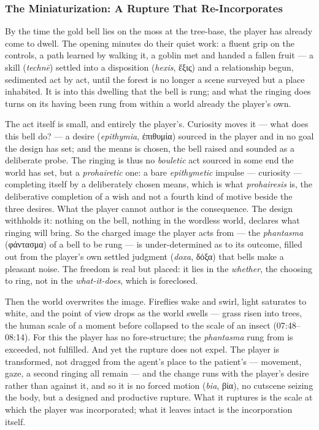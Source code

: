 \documentclass{article}
\newcommand{\gk}[1]{{\greekfont #1}}
\begin{document}
\subsubsection*{The Miniaturization: A Rupture That Re-Incorporates}

By the time the gold bell lies on the moss at the tree-base, the player has already come to dwell. The opening minutes do their quiet work: a fluent grip on the controls, a path learned by walking it, a goblin met and handed a fallen fruit — a skill (\textit{technē}) settled into a disposition (\textit{hexis}, \gk{ἕξις}) and a relationship begun, sedimented act by act, until the forest is no longer a scene surveyed but a place inhabited. It is into this dwelling that the bell is rung; and what the ringing does turns on its having been rung from within a world already the player's own.

The act itself is small, and entirely the player's. Curiosity moves it — what does this bell do? — a desire (\textit{epithymia}, \gk{ἐπιθυμία}) sourced in the player and in no goal the design has set; and the means is chosen, the bell raised and sounded as a deliberate probe. The ringing is thus no \textit{bouletic} act sourced in some end the world has set, but a \textit{prohairetic} one: a bare \textit{epithymetic} impulse — curiosity — completing itself by a deliberately chosen means, which is what \textit{prohairesis} is, the deliberative completion of a wish and not a fourth kind of motive beside the three desires. What the player cannot author is the consequence. The design withholds it: nothing on the bell, nothing in the wordless world, declares what ringing will bring. So the charged image the player acts from — the \textit{phantasma} (\gk{φάντασμα}) of a bell to be rung — is under-determined as to its outcome, filled out from the player's own settled judgment (\textit{doxa}, \gk{δόξα}) that bells make a pleasant noise. The freedom is real but placed: it lies in the \textit{whether}, the choosing to ring, not in the \textit{what-it-does}, which is foreclosed.

Then the world overwrites the image. Fireflies wake and swirl, light saturates to white, and the point of view drops as the world swells — grass risen into trees, the human scale of a moment before collapsed to the scale of an insect (07:48–08:14). For this the player has no fore-structure; the \textit{phantasma} rung from is exceeded, not fulfilled. And yet the rupture does not expel. The player is transformed, not dragged from the agent's place to the patient's — movement, gaze, a second ringing all remain — and the change runs with the player's desire rather than against it, and so it is no forced motion (\textit{bia}, \gk{βία}), no cutscene seizing the body, but a designed and productive rupture. What it ruptures is the scale at which the player was incorporated; what it leaves intact is the incorporation itself.
\end{document}
